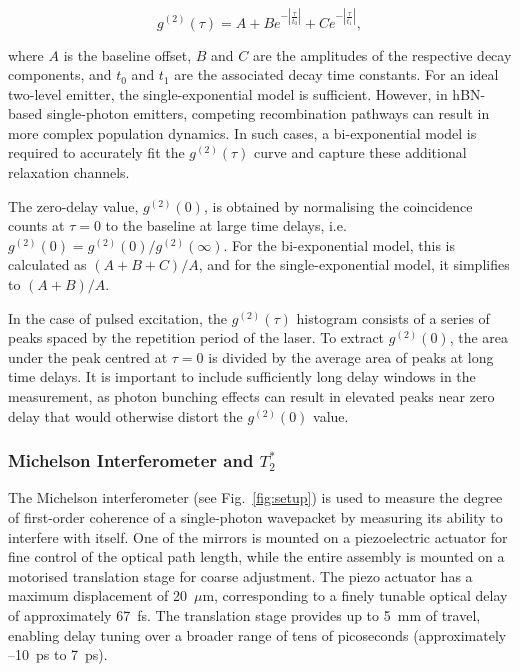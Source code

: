 \begin{equation}
    g^{(2)}(\tau) = A + B e^{-\left| \frac{\tau}{t_0} \right|} + C e^{-\left| \frac{\tau}{t_1} \right|},
    \label{eqn:bi-decay-g2}
\end{equation}

where $A$ is the baseline offset, $B$ and $C$ are the amplitudes of the respective decay components, and $t_0$ and $t_1$ are the associated decay time constants. For an ideal two-level emitter, the single-exponential model is sufficient. However, in hBN-based single-photon emitters, competing recombination pathways can result in more complex population dynamics. In such cases, a bi-exponential model is required to accurately fit the $g^{(2)}(\tau)$ curve and capture these additional relaxation channels.

The zero-delay value, $g^{(2)}(0)$, is obtained by normalising the coincidence counts at $\tau = 0$ to the baseline at large time delays, i.e. $g^{(2)}(0) = g^{(2)}(0)/g^{(2)}(\infty)$. For the bi-exponential model, this is calculated as $(A + B + C)/A$, and for the single-exponential model, it simplifies to $(A + B)/A$.

In the case of pulsed excitation, the $g^{(2)}(\tau)$ histogram consists of a series of peaks spaced by the repetition period of the laser. To extract $g^{(2)}(0)$, the area under the peak centred at $\tau = 0$ is divided by the average area of peaks at long time delays. It is important to include sufficiently long delay windows in the measurement, as photon bunching effects can result in elevated peaks near zero delay that would otherwise distort the $g^{(2)}(0)$ value.

\subsubsection{Michelson Interferometer and $T_2^*$}

The Michelson interferometer (see Fig.~\ref{fig:setup}) is used to measure the degree of first-order coherence of a single-photon wavepacket by measuring its ability to interfere with itself. One of the mirrors is mounted on a piezoelectric actuator for fine control of the optical path length, while the entire assembly is mounted on a motorised translation stage for coarse adjustment. The piezo actuator has a maximum displacement of 20~$\mu$m, corresponding to a finely tunable optical delay of approximately 67~fs. The translation stage provides up to 5~mm of travel, enabling delay tuning over a broader range of tens of picoseconds (approximately --10~ps to 7~ps).

